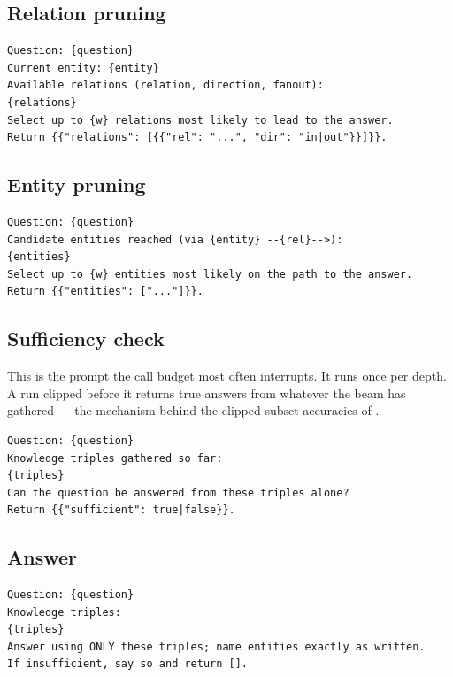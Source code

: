 \subsection*{Relation pruning}

\begin{lstlisting}[style=verbatimblock]
Question: {question}
Current entity: {entity}
Available relations (relation, direction, fanout):
{relations}
Select up to {w} relations most likely to lead to the answer.
Return {{"relations": [{{"rel": "...", "dir": "in|out"}}]}}.
\end{lstlisting}

\subsection*{Entity pruning}

\begin{lstlisting}[style=verbatimblock]
Question: {question}
Candidate entities reached (via {entity} --{rel}-->):
{entities}
Select up to {w} entities most likely on the path to the answer.
Return {{"entities": ["..."]}}.
\end{lstlisting}

\subsection*{Sufficiency check}

This is the prompt the call budget most often interrupts. It runs once per
depth. A run clipped before it returns \textsf{true} answers from whatever
the beam has gathered --- the mechanism behind the clipped-subset accuracies of
.

\begin{lstlisting}[style=verbatimblock]
Question: {question}
Knowledge triples gathered so far:
{triples}
Can the question be answered from these triples alone?
Return {{"sufficient": true|false}}.
\end{lstlisting}

\subsection*{Answer}

\begin{lstlisting}[style=verbatimblock]
Question: {question}
Knowledge triples:
{triples}
Answer using ONLY these triples; name entities exactly as written.
If insufficient, say so and return [].
\end{lstlisting}

\endinput
